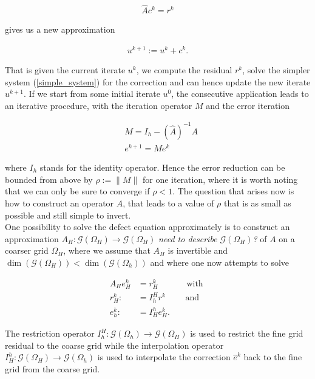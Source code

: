 \documentclass[../draft_1.tex]{subfiles}
\begin{document}
\begin{ceqn}
	\begin{align}
	\label{simple_system}
\hat{A} c^k = r^k
	\end{align}
\end{ceqn}
gives us a new approximation 
\begin{ceqn}
	\begin{align}
	\label{update_correction}
u^{k+1} := u^k + c^k.
	\end{align}
\end{ceqn}
That is given the current iterate $u^k$, we compute the residual $r^k$, solve the simpler system (\ref{simple_system}) for the correction and can hence update the new iterate $u^{k+1}$. If we start from some initial iterate $u^0$, the consecutive application leads to an iterative procedure, with the iteration operator $M$ and the error iteration 
\begin{ceqn}
	\begin{align}
&M = I_h - (\hat{A})^{-1} A \\
&e^{k+1} = M e^k
	\end{align}
\end{ceqn}
where $I_h$ stands for the identity operator. Hence the error reduction can be bounded from above by $\rho := \| M \|$ for one iteration, where it is worth noting that we can only be sure to converge if $\rho < 1$.  The question that arises now is how to construct an operator $\hat{A}$, that leads to a value of $\rho$ that is as small as possible and still simple to invert. 
\smallskip 
\\
One possibility to solve the defect equation approximately is to construct an approximation $A_H: \mathcal{G}(\Omega_H) \rightarrow \mathcal{G}(\Omega_H)$ \textit{need to describe $\mathcal{G}(\Omega_H)$?} of $A$ on a coarser grid $\Omega_H$, where we assume that $A_H$ is invertible and $\dim (\mathcal{G}(\Omega_H)) < \dim(\mathcal{G}(\Omega_h))$ and where one now attempts to solve
\begin{ceqn}
	\begin{align}
	\label{coarse_grid_problem}
A_H e_H^k &= r_H^k \quad \qquad \text{ with } \\
r_H^k :&= I_h^H r^k \qquad \text{ and }\\
e_h^k :&= I_H^h e_H^k. 
	\end{align}
\end{ceqn}
The restriction operator $I_h^H : \mathcal{G}(\Omega_h) \rightarrow \mathcal{G}(\Omega_H)$ is used to restrict the fine grid residual to the coarse grid while the interpolation operator $I_H^h: \mathcal{G}(\Omega_H) \rightarrow \mathcal{G}(\Omega_h)$ is used to interpolate the correction $ \hat{e}^k$ back to the fine grid from the coarse grid. 
\end{document}
